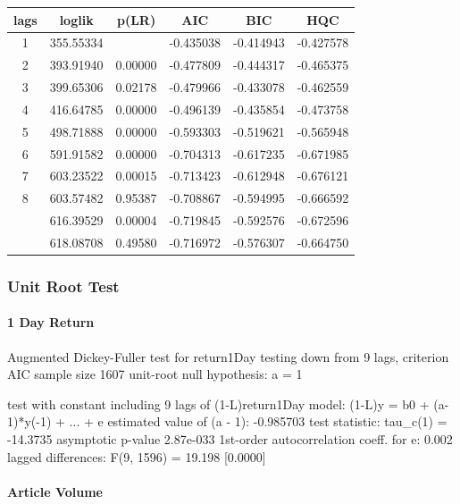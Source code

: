 \begin{center}
\begin{tabular}{ c c c c c c }
lags & loglik & p(LR) & AIC & BIC & HQC \\
\hline
1 & 355.55334 & & -0.435038 & -0.414943 & -0.427578 \\
2 & 393.91940 & 0.00000 & -0.477809 & -0.444317 & -0.465375 \\
3 & 399.65306 & 0.02178 & -0.479966 & -0.433078 & -0.462559 \\
4 & 416.64785 & 0.00000 & -0.496139 & -0.435854 & -0.473758 \\
5 & 498.71888 & 0.00000 & -0.593303 & -0.519621 & -0.565948 \\
6 & 591.91582 & 0.00000 & -0.704313 & -0.617235 & -0.671985 \\
7 & 603.23522 & 0.00015 & -0.713423 & -0.612948 & -0.676121 \\
8 & 603.57482 & 0.95387 & -0.708867 & -0.594995 & -0.666592 \\
\arrayrulecolor{red}\hline
9 & 616.39529 & 0.00004 & -0.719845 & -0.592576 & -0.672596 \\
\arrayrulecolor{red}\hline
10 & 618.08708 & 0.49580 & -0.716972 & -0.576307 & -0.664750 \\
\end{tabular}
\end{center}

\subsubsection{Unit Root Test}

\paragraph{1 Day Return}

Augmented Dickey-Fuller test for return1Day
testing down from 9 lags, criterion AIC
sample size 1607
unit-root null hypothesis: a = 1

test with constant 
including 9 lags of (1-L)return1Day
model: (1-L)y = b0 + (a-1)*y(-1) + ... + e
estimated value of (a - 1): -0.985703
test statistic: tau\_c(1) = -14.3735
asymptotic p-value 2.87e-033
1st-order autocorrelation coeff. for e: 0.002
lagged differences: F(9, 1596) = 19.198 [0.0000]

\paragraph{Article Volume}

